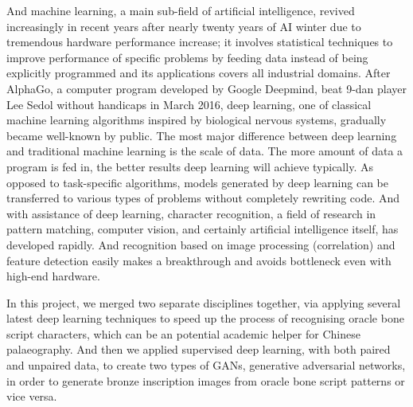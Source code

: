 And machine learning, a main sub-field of artificial intelligence, revived increasingly in recent years after nearly twenty years of AI winter due to tremendous hardware performance increase; it involves statistical techniques to improve performance of specific problems by feeding data instead of being explicitly programmed and its applications covers all industrial domains. After AlphaGo, a computer program developed by Google Deepmind, beat 9-dan player Lee Sedol without handicaps in March 2016, deep learning, one of classical machine learning algorithms inspired by biological nervous systems, gradually became well-known by public. The most major difference between deep learning and traditional machine learning is the scale of data. The more amount of data a program is fed in, the better results deep learning will achieve typically. As opposed to task-specific algorithms, models generated by deep learning can be transferred to various types of problems without completely rewriting code. And with assistance of deep learning, character recognition, a field of research in pattern matching, computer vision, and certainly artificial intelligence itself, has developed rapidly. And recognition based on image processing (correlation) and feature detection easily makes a breakthrough and avoids bottleneck even with high-end hardware.

In this project, we merged two separate disciplines together, via applying several latest deep learning techniques to speed up the process of recognising oracle bone script characters, which can be an potential academic helper for Chinese palaeography. And then we applied supervised deep learning, with both paired and unpaired data, to create two types of GANs, generative adversarial networks, in order to generate bronze inscription images from oracle bone script patterns or vice versa.